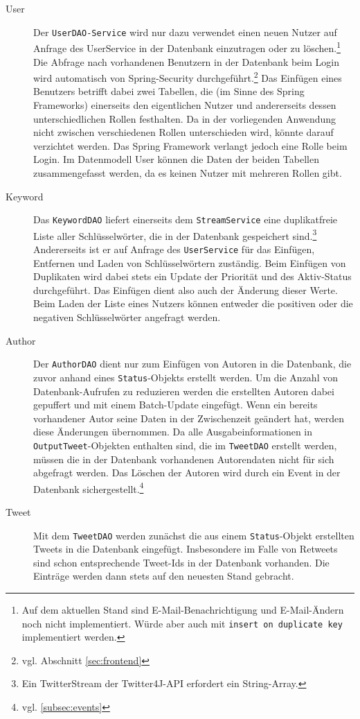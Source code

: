 \begin{description}
	\item [User] Der \texttt{UserDAO-Service} wird nur dazu verwendet einen neuen Nutzer auf Anfrage des UserService in der Datenbank einzutragen oder zu löschen.\footnote{Auf dem aktuellen Stand sind E-Mail-Benachrichtigung und E-Mail-Ändern noch nicht implementiert. Würde aber auch mit \texttt{insert on duplicate key} implementiert werden.} Die Abfrage nach vorhandenen Benutzern in der Datenbank beim Login wird automatisch von Spring-Security durchgeführt.\footnote{vgl. Abschnitt \ref{sec:frontend}} Das Einfügen eines Benutzers betrifft dabei zwei Tabellen, die (im Sinne des Spring Frameworks) einerseits den eigentlichen Nutzer und andererseits dessen unterschiedlichen Rollen festhalten. Da in der vorliegenden Anwendung nicht zwischen verschiedenen Rollen unterschieden wird, könnte darauf verzichtet werden. Das Spring Framework verlangt jedoch eine Rolle beim Login. Im Datenmodell User können die Daten der beiden Tabellen zusammengefasst werden, da es keinen Nutzer mit mehreren Rollen gibt.
	\item [Keyword] Das \texttt{KeywordDAO} liefert einerseits dem \texttt{StreamService} eine duplikatfreie Liste aller Schlüsselwörter, die in der Datenbank gespeichert sind.\footnote{Ein TwitterStream der Twitter4J-API erfordert ein String-Array.} Andererseits ist er auf Anfrage des \texttt{UserService} für das Einfügen, Entfernen und Laden von Schlüsselwörtern zuständig. Beim Einfügen von Duplikaten wird dabei stets ein Update der Priorität und des Aktiv-Status durchgeführt. Das Einfügen dient also auch der Änderung dieser Werte. Beim Laden der Liste eines Nutzers können entweder die positiven oder die negativen Schlüsselwörter angefragt werden.
	\item [Author] Der \texttt{AuthorDAO} dient nur zum Einfügen von Autoren in die Datenbank, die zuvor anhand eines \texttt{Status}-Objekts erstellt werden. Um die Anzahl von Datenbank-Aufrufen zu reduzieren werden die erstellten Autoren dabei gepuffert und mit einem Batch-Update eingefügt. Wenn ein bereits vorhandener Autor seine Daten in der Zwischenzeit geändert hat, werden diese Änderungen übernommen. Da alle Ausgabeinformationen in \texttt{OutputTweet}-Objekten enthalten sind, die im \texttt{TweetDAO} erstellt werden, müssen die in der Datenbank vorhandenen Autorendaten nicht für sich abgefragt werden. Das Löschen der Autoren wird durch ein Event in der Datenbank sichergestellt.\footnote{vgl. \autoref{subsec:events}}
	\item [Tweet] Mit dem \texttt{TweetDAO} werden zunächst die aus einem \texttt{Status}-Objekt erstellten Tweets in die Datenbank eingefügt. Insbesondere im Falle von Retweets sind schon entsprechende Tweet-Ids in der Datenbank vorhanden. Die Einträge werden dann stets auf den neuesten Stand gebracht.
\end{description}
